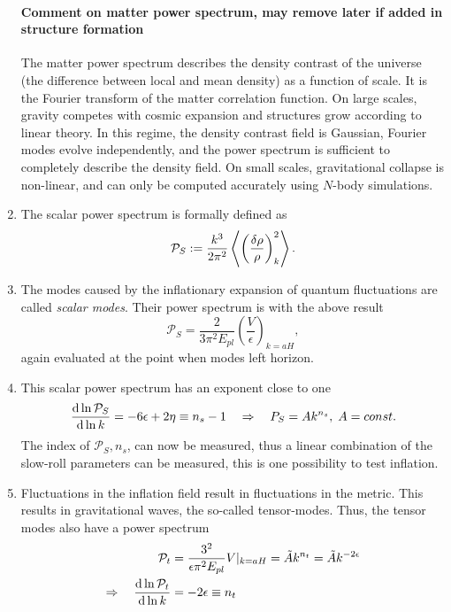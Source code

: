 \begin{enumerate}
\paragraph{Comment on matter power spectrum, may remove later if added in structure formation}
The matter power spectrum describes the density contrast of the universe (the difference between local and mean density) as a function of scale. It is the Fourier transform of the matter correlation function. On large scales, gravity competes with cosmic expansion and structures grow according to linear theory. In this regime, the density contrast field is Gaussian, Fourier modes evolve independently, and the power spectrum is sufficient to completely describe the density field. On small scales, gravitational collapse is non-linear, and can only be computed accurately using $N$-body simulations.
\item The scalar power spectrum is formally defined as
\begin{equation}
\mathcal{P}_S := \frac{k^3}{2 \pi^2} \expval{\left(\frac{\delta \rho}{\rho}\right)^2_k}.
\end{equation}
\item The modes caused by the inflationary expansion of quantum fluctuations are called \emph{scalar modes}. Their power spectrum is with the above result
\begin{equation}
	\mathcal{P}_S = \frac{2}{3\pi^2 E_{pl}} \left(\frac{V}{\epsilon}\right)_{k=aH},
\end{equation}
again evaluated at the point when modes left horizon.
\item This scalar power spectrum has an exponent close to one
\begin{equation}
	\frac{\mathrm{d} \ln \mathcal{P}_S}{\mathrm{d} \ln k} = - 6 \epsilon +2 \eta \equiv n_s -1 \quad \Rightarrow\quad P_S = A k^{n_s}, \; A=const.
\end{equation}
The index of $\mathcal{P}_S,n_s$, can now be measured, thus a linear combination of the slow-roll parameters can be measured, this is one possibility to test inflation.
\item Fluctuations in the inflation field result in fluctuations in the metric. This results in gravitational waves, the so-called tensor-modes. Thus, the tensor modes also have a power spectrum
\begin{align}
	\mathcal{P}_t &= \frac{3^2}{\epsilon \pi^2 E_{pl}} V|_{k=aH} = \tilde{A}k^{n_t} = \tilde{A} k^{-2 \epsilon} \nonumber \\
	\Rightarrow \quad \frac{\md \ln \mathcal{P}_t}{\md \ln k} &= -2 \epsilon \equiv n_t \nonumber \\

\end{align}
\end{enumerate}
